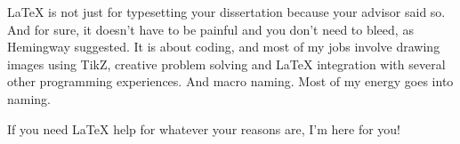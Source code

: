 \LaTeX{} is not just for typesetting your dissertation because your advisor said so. And for sure, it doesn’t have to be painful and you don’t need to bleed, as Hemingway suggested. It is about coding, and most of my jobs involve drawing images using TikZ, creative problem solving and \LaTeX{} integration with several other programming experiences. And macro naming. Most of my energy goes into naming.

If you need \LaTeX{} help for whatever your reasons are, I’m here for you!
\endgroup
\clearpage

    
    
    
    
    
    
    
    
    


    
    
    
    


